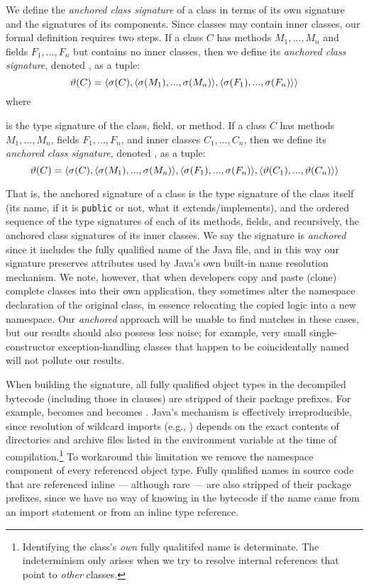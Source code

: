 We define the \emph{anchored class signature} of a class in terms of its
own signature and the signatures of its components.  Since classes may
contain inner classes, our formal definition requires two steps.
If a class $C$ has methods $M_1, ... , M_n$ and fields $F_1, ... , F_n$ but
contains no inner classes, then  we define its \emph{anchored class
signature}, denoted , as a tuple:
\[
\vartheta(C) =
\langle \sigma(C),
    \langle \sigma(M_1), ... , \sigma(M_n) \rangle,
    \langle \sigma(F_1), ... , \sigma(F_n) \rangle
\rangle \]
\noindent
where \signature{a} is the type signature of the class, field,  or method.
If a class $C$ has methods $M_1, ... , M_n$, fields $F_1, ... , F_n$, and
inner classes $C_1, ... , C_n$, then  we define its \emph{anchored class
signature}, denoted , as a tuple:
\[
\vartheta(C) =
\langle \sigma(C),
    \langle \sigma(M_1), ... , \sigma(M_n) \rangle,
    \langle \sigma(F_1), ... , \sigma(F_n) \rangle,
    \langle \vartheta(C_1), ... , \vartheta(C_n) \rangle
\rangle \]

\noindent
That is, the anchored signature of a class is the type signature of the
class itself (its name, if it is \texttt{public} or not, what it
extends/implements), and the ordered sequence of the type signatures of
each of its methods, fields, and recursively, the anchored class signatures
of its inner classes.  We say the signature is \emph{anchored} since it
includes the fully qualified name of the Java file, and in this way our
signature preserves attributes used by Java's own built-in name resolution
mechanism.  We note, however, that when
developers copy and paste (clone) complete classes into their own
application, they sometimes alter the namespace declaration of the original
class, in essence relocating the copied logic into a new namespace.  Our
\emph{anchored} approach will be unable to find matches in these cases, but
our results should also possess less noise; for example, very small
single-constructor exception-handling classes that happen to be
coincidentally named will not pollute our results.

When building the signature, all fully qualified
object types in the decompiled bytecode
(including those in  clauses)
are stripped of their package prefixes.
For example,  becomes 
and  becomes .
Java's  mechanism is effectively
irreproducible, since resolution of wildcard imports
(e.g., )
depends on the exact contents of
directories and archive files listed in the
 environment variable at the time of
compilation.\footnote{Identifying
%
the class's \emph{own} fully qualitifed name is determinate.
The indeterminism only arises when we try to resolve internal
references that point to \emph{other} classes.}
%
To workaround this limitation we remove the namespace
component of every referenced object type.
Fully qualified names in source code
that are referenced inline --- although rare --- are also
stripped of their package prefixes, since we have no way
of knowing in the bytecode if the name came from an import
statement or from an inline type reference.

